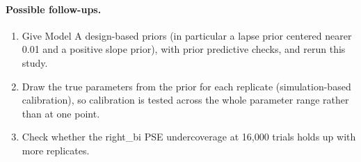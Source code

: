 \documentclass[11pt]{article}
\begin{document}
\paragraph{Possible follow-ups.}
\begin{enumerate}
  \item Give Model A design-based priors (in particular a lapse prior centered
        nearer 0.01 and a positive slope prior), with prior predictive checks, and rerun this study.
  \item Draw the true parameters from the prior for each replicate
        (simulation-based calibration), so calibration is tested across the
        whole parameter range rather than at one point.
  \item Check whether the right\_bi PSE undercoverage at 16{,}000 trials holds
        up with more replicates.
\end{enumerate}
\end{document}
